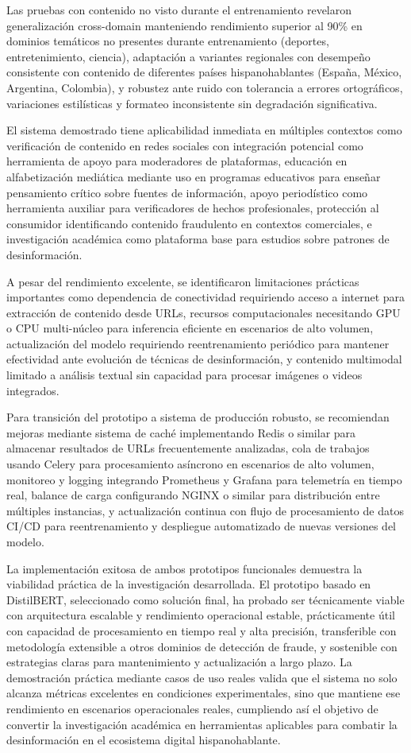 Las pruebas con contenido no visto durante el entrenamiento revelaron generalización cross-domain manteniendo rendimiento superior al 90\% en dominios temáticos no presentes durante entrenamiento (deportes, entretenimiento, ciencia), adaptación a variantes regionales con desempeño consistente con contenido de diferentes países hispanohablantes (España, México, Argentina, Colombia), y robustez ante ruido con tolerancia a errores ortográficos, variaciones estilísticas y formateo inconsistente sin degradación significativa.

El sistema demostrado tiene aplicabilidad inmediata en múltiples contextos como verificación de contenido en redes sociales con integración potencial como herramienta de apoyo para moderadores de plataformas, educación en alfabetización mediática mediante uso en programas educativos para enseñar pensamiento crítico sobre fuentes de información, apoyo periodístico como herramienta auxiliar para verificadores de hechos profesionales, protección al consumidor identificando contenido fraudulento en contextos comerciales, e investigación académica como plataforma base para estudios sobre patrones de desinformación.

A pesar del rendimiento excelente, se identificaron limitaciones prácticas importantes como dependencia de conectividad requiriendo acceso a internet para extracción de contenido desde URLs, recursos computacionales necesitando GPU o CPU multi-núcleo para inferencia eficiente en escenarios de alto volumen, actualización del modelo requiriendo reentrenamiento periódico para mantener efectividad ante evolución de técnicas de desinformación, y contenido multimodal limitado a análisis textual sin capacidad para procesar imágenes o videos integrados.

Para transición del prototipo a sistema de producción robusto, se recomiendan mejoras mediante sistema de caché implementando Redis o similar para almacenar resultados de URLs frecuentemente analizadas, cola de trabajos usando Celery para procesamiento asíncrono en escenarios de alto volumen, monitoreo y logging integrando Prometheus y Grafana para telemetría en tiempo real, balance de carga configurando NGINX o similar para distribución entre múltiples instancias, y actualización continua con flujo de procesamiento de datos CI/CD para reentrenamiento y despliegue automatizado de nuevas versiones del modelo.

La implementación exitosa de ambos prototipos funcionales demuestra la viabilidad práctica de la investigación desarrollada. El prototipo basado en DistilBERT, seleccionado como solución final, ha probado ser técnicamente viable con arquitectura escalable y rendimiento operacional estable, prácticamente útil con capacidad de procesamiento en tiempo real y alta precisión, transferible con metodología extensible a otros dominios de detección de fraude, y sostenible con estrategias claras para mantenimiento y actualización a largo plazo. La demostración práctica mediante casos de uso reales valida que el sistema no solo alcanza métricas excelentes en condiciones experimentales, sino que mantiene ese rendimiento en escenarios operacionales reales, cumpliendo así el objetivo de convertir la investigación académica en herramientas aplicables para combatir la desinformación en el ecosistema digital hispanohablante.